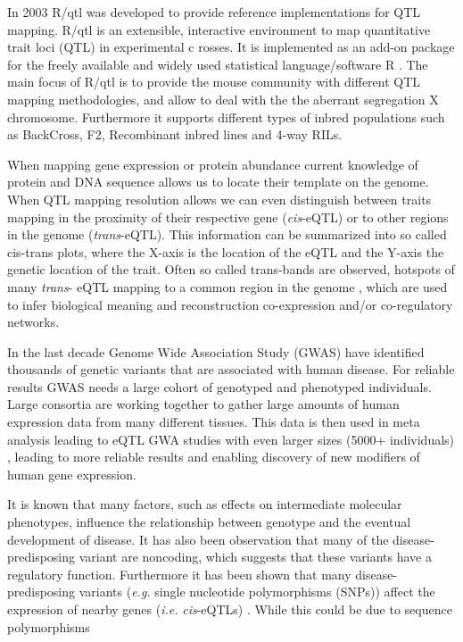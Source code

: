 In 2003 R/qtl was developed to provide reference implementations for QTL mapping. R/qtl is 
an extensible, interactive environment to map quantitative trait loci (QTL) in experimental c
rosses. It is implemented as an add-on package for the freely available and widely used 
statistical language/software R \cite{R:2009}. The main focus of R/qtl is to provide 
the mouse community with different QTL mapping methodologies, and allow to deal with the 
the aberrant segregation X chromosome. Furthermore it supports different types of inbred 
populations such as BackCross, F2, Recombinant inbred lines and 4-way RILs. \cite{Broman:2003}



When mapping gene expression or protein abundance current knowledge of protein and DNA sequence 
allows us to locate their template on the genome. When QTL mapping resolution allows we can even 
distinguish between traits mapping in the proximity of their respective gene (\emph{cis}-eQTL) 
or to other regions in the genome (\emph{trans}-eQTL). This information can be summarized into 
so called cis-trans plots, where the X-axis is the location of the eQTL and the Y-axis the genetic 
location of the trait. Often so called trans-bands are observed, hotspots of many \emph{trans}-
eQTL mapping to a common region in the genome \cite{Breitling:2008a}, which are used to infer 
biological meaning and reconstruction co-expression and/or co-regulatory networks.

In the last decade Genome Wide Association Study (GWAS) have identified thousands of genetic 
variants that are associated with human disease\cite{Hindorff:2009}. For reliable results GWAS 
needs a large cohort of genotyped and phenotyped individuals. Large consortia are working 
together to gather large amounts of human expression data from many different tissues. This 
data is then used in meta analysis leading to eQTL GWA studies with even larger sizes 
(5000+ individuals) \cite{Lude:2011}, leading to more reliable results and enabling discovery 
of new modifiers of human gene expression.

It is known that many factors, such as effects on intermediate molecular phenotypes, influence 
the relationship between genotype and the eventual development of disease. It has also been 
observation that many of the disease-predisposing variant are noncoding, which suggests that 
these variants have a regulatory function. Furthermore it has been shown that many disease-predisposing variants 
(\emph{e.g.} single nucleotide polymorphisms (SNPs)) affect the expression of nearby genes (\emph{i.e.} 
\emph{cis}-eQTLs) \cite{Powell:2012, Lude:2011, Zeller:2010}. While this could be due to sequence 
polymorphisms 

